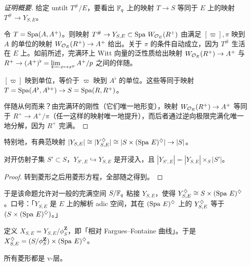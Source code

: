 \begin{proof}[证明概要]
给定 untilt $T^\#/E$，要看出 $\mathbb{F}_q$ 上的映射 $T\to S$ 等同于 $E$ 上的映射 $T^\#\to Y_{S,E}$。

令 $T=\operatorname{Spa}(A,A^+)$。则映射 $T^\#\to Y_{S,E}\subset\operatorname{Spa}\,W_{\mathcal{O}_E}(R^+)$ 由满足 $[\varpi],\pi$ 映到 $A$ 的单位的映射 $W_{\mathcal{O}_E}(R^+)\to A^+$ 给出。关于 $\pi$ 的条件自动成立，因为 $T^\#$ 生活在 $E$ 上。如前所述，完满环上 Witt 向量的泛性质给出映射 $W_{\mathcal{O}_E}(R^+)\to A^+$ 与 $R^+\to(A^+)^\flat=\varprojlim_{x\mapsto x^p}A^+/p$ 之间的伴随。

$[\varpi]$ 映到单位，等价于 $\varpi$ 映到 $A^\flat$ 的单位。这些等同于映射 $T=\operatorname{Spa}(A^\flat,A^{\flat+})\to S=\operatorname{Spa}(R,R^+)$。

伴随从何而来？由完满环的刚性（它们唯一地形变），映射 $W_{\mathcal{O}_E}(R^+)\to A^+$ 等同于 $R^+\to A^+/\pi$（任一这样的映射唯一地提升），而后者通过逆向极限完满化唯一地分解，因为 $R^+$ 完满。
\end{proof}

特别地，有典范映射 $|Y_{S,E}|\cong|Y^{\diamondsuit}_{S,E}|\cong|S\times(\operatorname{Spa}\,E)^{\diamondsuit}|\to|S|$。

\begin{proposition}
对开仿射子集 $S'\subset S$，$Y_{S',E}\hookrightarrow Y_{S,E}$ 是开浸入，且 $|Y_{S',E}|=|Y_{S,E}|\times_S|S'|$。
\end{proposition}

\begin{proof}
转到菱形之后用菱形方程，全部随之得到。
\end{proof}

于是该命题允许对一般的完满空间 $S/\mathbb{F}_q$ 粘接 $Y_{S,E}$，使得 $Y^{\diamondsuit}_{S,E}\cong S\times(\operatorname{Spa}\,E)^{\diamondsuit}$。口号：「$Y_{S,E}$ 是 $E$ 上的解析 adic 空间，其在 $(\operatorname{Spa}\,E)^{\diamondsuit}$ 上的 $Y^{\diamondsuit}_{S,E}$ 等于 $(S\times(\operatorname{Spa}\,E)^{\diamondsuit})$。」


\begin{definition}
定义 $X_{S,E}=Y_{S,E}/\phi_S^{\mathbf Z}$，即「相对 Fargues--Fontaine 曲线」。于是 $X^{\diamondsuit}_{S,E}=(S/\phi_S^{\mathbf Z})\times(\operatorname{Spa}\,E)^{\diamondsuit}$。
\end{definition}

\begin{proposition}
所有菱形都是 v-层。
\end{proposition}
